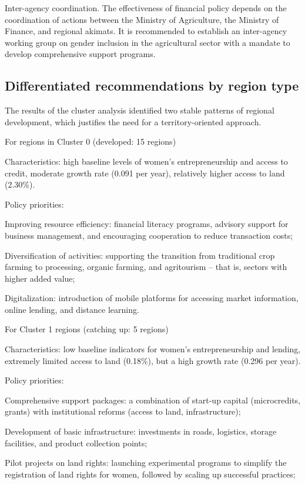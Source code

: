 \documentclass[pdflatex,sn-mathphys-ay]{sn-jnl}
\begin{document}
Inter-agency coordination. The effectiveness of financial policy depends
on the coordination of actions between the Ministry of Agriculture, the
Ministry of Finance, and regional akimats. It is recommended to
establish an inter-agency working group on gender inclusion in the
agricultural sector with a mandate to develop comprehensive support
programs.

\subsection{Differentiated recommendations by region type}

The results of the cluster analysis identified two stable patterns of
regional development, which justifies the need for a territory-oriented
approach.

For regions in Cluster 0 (developed: 15 regions)

Characteristics: high baseline levels of women's entrepreneurship and
access to credit, moderate growth rate (0.091 per year), relatively
higher access to land (2.30\%).

Policy priorities:

Improving resource efficiency: financial literacy programs, advisory
support for business management, and encouraging cooperation to reduce
transaction costs;

Diversification of activities: supporting the transition from
traditional crop farming to processing, organic farming, and agritourism
-- that is, sectors with higher added value;

Digitalization: introduction of mobile platforms for accessing market
information, online lending, and distance learning.

For Cluster 1 regions (catching up: 5 regions)

Characteristics: low baseline indicators for women's entrepreneurship
and lending, extremely limited access to land (0.18\%), but a high
growth rate (0.296 per year).

Policy priorities:

Comprehensive support packages: a combination of start-up capital
(microcredits, grants) with institutional reforms (access to land,
infrastructure);

Development of basic infrastructure: investments in roads, logistics,
storage facilities, and product collection points;

Pilot projects on land rights: launching experimental programs to
simplify the registration of land rights for women, followed by scaling
up successful practices;
\end{document}
